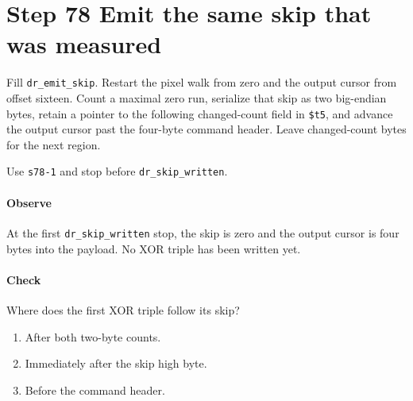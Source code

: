\section{Step 78 Emit the same skip that was measured}
Fill \texttt{dr\_emit\_skip}. Restart the pixel walk from zero and the output cursor from offset sixteen. Count a maximal zero run, serialize that skip as two big-endian bytes, retain a pointer to the following changed-count field in \texttt{\$t5}, and advance the output cursor past the four-byte command header. Leave changed-count bytes for the next region.

Use \texttt{s78-1} and stop before \texttt{dr\_skip\_written}.

\paragraph{Observe} At the first \texttt{dr\_skip\_written} stop, the skip is zero and the output cursor is four bytes into the payload. No XOR triple has been written yet.

\paragraph{Check} Where does the first XOR triple follow its skip?
\begin{enumerate}[label=\Alph*.]
\item After both two-byte counts.
\item Immediately after the skip high byte.
\item Before the command header.
\end{enumerate}
